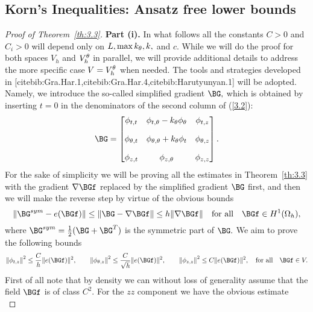 \subsection{Korn's Inequalities: Ansatz free lower bounds}

\begin{proof}[Proof of Theorem~{\ref{th:3.3}}]
\textbf{Part (i).} In what follows all the constants $C>0$ and $C_i>0$ will depend only on $L,\max k_\theta,k,$ and $c.$ While we will do the proof for both spaces $V_h$ and $V_h^\theta$ in parallel, we will provide additional details to address the more specific case $V=V_h^\theta$ when needed. The tools and strategies developed in [cite{bib:Gra.Har.1},cite{bib:Gra.Har.4},cite{bib:Harutyunyan.1}] will be adopted. Namely, we introduce the so-called simplified gradient $\BG,$ which is obtained by inserting $t=0$ in the denominators of the second column of (\ref{3.2}):
\begin{equation}
\label{4.11}
\BG=\begin{bmatrix} \phi_{t,t} & \phi_{t,\theta}-k_{\theta }\phi_\theta & \phi_{t,z}       \\[10pt]
\phi_{\theta,t} & \phi_{\theta,\theta}+k_{\theta }\phi_t& \phi_{\theta,z}      \\[10pt] 
\phi_{z,t} & \phi_{z,\theta}  & \phi_{z,z} \end{bmatrix}.
\end{equation}
For the sake of simplicity we will be proving all the estimates in Theorem~\ref{th:3.3} with the gradient $\nabla\BGf$ replaced by the simplified gradient $\BG$ first, and then we will make the reverse step by virtue of the obvious bounds 
 \begin{equation}
\label{4.12}
\|\BG^{sym}-e(\BGf)\|\leq \|\BG-\nabla\BGf\|\leq h\|\nabla \BGf\|\quad \text{for all}\quad \BGf\in H^1(\Omega_h),
\end{equation}
where $\BG^{sym}=\frac{1}{2}(\BG+\BG^T)$ is the symmetric part of $\BG.$ We aim to prove the following bounds 
\begin{equation}
\label{4.13}
\left\|\phi_{t, z}\right\|^{2} \leq \frac{C}{h}\|e(\BGf)\|^{2},\qquad
\left\|\phi_{\theta, z}\right\|^{2} \leq \frac{C}{\sqrt{h}}\|e(\BGf)\|^{2},\qquad
\left\|\phi_{z, z}\right\|^{2} \leq C\|e(\BGf)\|^{2},\quad\text{for all}\quad \BGf\in V.
\end{equation}
First of all note that by density we can without loss of generality assume that the field $\BGf$ is of class $C^2.$ For the $zz$ component we have the obvious estimate 
\begin{equation}

\end{equation}
\end{proof}
